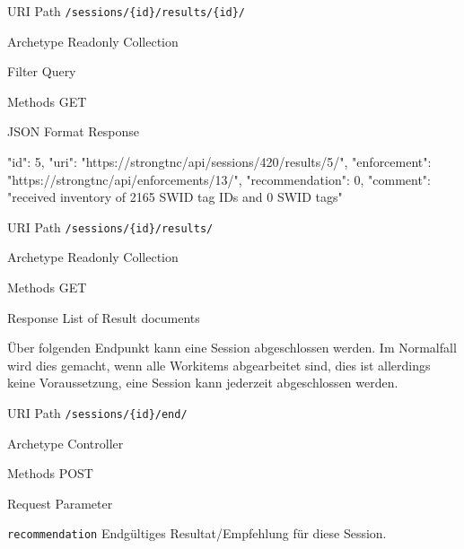 \begin{mdframed}[style=def]
\begin{description*}
	\item[URI Path] \texttt{/sessions/\{id\}/results/\{id\}/}
	\item[Archetype] Readonly Collection
	\item[Filter Query] \hfill
	\item[Methods] GET
	\item[JSON Format Response] \hfill
\begin{jsoncode}
{
	"id": 5,
	"uri": "https://strongtnc/api/sessions/420/results/5/",
	"enforcement": "https://strongtnc/api/enforcements/13/",
	"recommendation": 0,	 
	"comment": "received inventory of 2165 SWID tag IDs and 0 SWID tags"
}
\end{jsoncode}
\end{description*}
\end{mdframed}

\begin{mdframed}[style=def]
\begin{description*}
	\item[URI Path] \texttt{/sessions/\{id\}/results/}
	\item[Archetype] Readonly Collection
	\item[Methods] GET
	\item[Response] List of Result documents
\end{description*}
\end{mdframed}

Über folgenden Endpunkt kann eine Session abgeschlossen werden. Im Normalfall
wird dies gemacht, wenn alle Workitems abgearbeitet sind, dies ist allerdings
keine Voraussetzung, eine Session kann jederzeit abgeschlossen werden.

\begin{mdframed}[style=def]
\begin{description*}
	\item[URI Path] \texttt{/sessions/\{id\}/end/}
	\item[Archetype] Controller
	\item[Methods] POST
	\item[Request Parameter] \hfill
	\begin{description*}
		\item[\texttt{recommendation}] Endgültiges Resultat/Empfehlung für diese
		Session.
	\end{description*}
\end{description*}
\end{mdframed}

